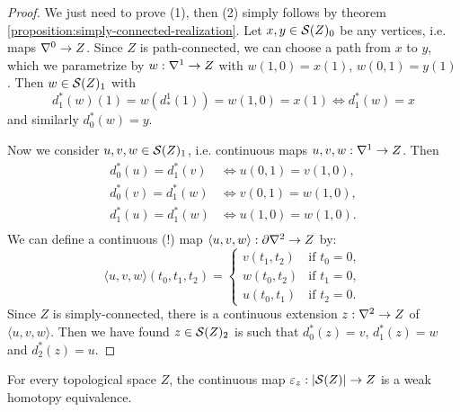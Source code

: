 \begin{proof}
We just need to prove (1), then (2) simply follows by
theorem \ref{proposition:simply-connected-realization}. Let $x,y\in\S(Z)_0$ be any vertices, i.e. maps $\sx{0}\to Z$. Since $Z$ is path-connected, we can choose a path from $x$ to $y$, which we parametrize by $w:\sx{1}\to Z$ with $w(1,0)=x(1)$, $w(0,1)=y(1)$. Then $w\in\S(Z)_1$ with
\[d_1^*(w)(1)=w(d_*^1(1))=w(1,0)=x(1)\iff d_1^*(w)=x\]
and similarly $d_0^*(w)=y$.

Now we consider $u,v,w\in\S(Z)_1$, i.e. continuous maps $u,v,w:\sx{1}\to Z$. Then
\begin{align*}
    d_0^*(u)=d_1^*(v) &\iff u(0,1)=v(1,0),\\
    d_0^*(v)=d_1^*(w) &\iff v(0,1)=w(1,0),\\
    d_1^*(u)=d_1^*(w) &\iff u(1,0)=w(1,0).\\
\end{align*}
We can define a continuous (!) map $\langle u,v,w\rangle:\de\sx{2}\to Z$ by:
\[\langle u,v,w\rangle(t_0,t_1,t_2)=\begin{cases}
v(t_1,t_2) & \text{if }t_0=0,\\
w(t_0,t_2) & \text{if }t_1=0,\\
u(t_0,t_1) & \text{if }t_2=0.
\end{cases}\]
Since $Z$ is simply-connected, there is a continuous extension $z:\sx{2}\to Z$ of $\langle u,v,w\rangle$. Then we have found $z\in\S(Z)_2$ is such that $d_0^*(z)=v$, $d_1^*(z)=w$ and $d_2^*(z)=u$.
\end{proof}

\begin{theorem}
For every topological space $Z$, the continuous map $\epsilon_z:|\S(Z)|\to Z$ is a weak homotopy equivalence.
\end{theorem}

